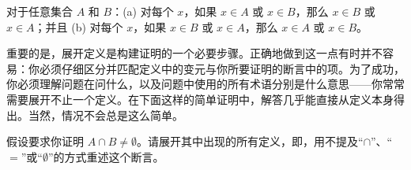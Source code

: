 \documentclass[../../../include/open-logic-section]{subfiles}
\begin{document}
\begin{prop}
对于任意集合 $A$ 和 $B$：(a) 对每个 $x$，如果 $x \in A$ 或 $x \in B$，那么 $x \in B$ 或 $x \in A$；并且 (b) 对每个 $x$，如果 $x \in B$ 或 $x \in A$，那么 $x \in A$ 或 $x \in B$。
\end{prop}

重要的是，展开定义是构建证明的一个必要步骤。正确地做到这一点有时并不容易：你必须仔细区分并匹配定义中的变元与你所要证明的断言中的项。为了成功，你必须理解问题在问什么，以及问题中使用的所有术语分别是什么意思——你常常需要展开不止一个定义。在下面这样的简单证明中，解答几乎能直接从定义本身得出。当然，情况不会总是这么简单。

\begin{prob}
假设要求你证明 $A \cap B \neq \emptyset$。请展开其中出现的所有定义，即，用不提及“$\cap$”、“$=$”或“$\emptyset$”的方式重述这个断言。
\end{prob}
\end{document}
